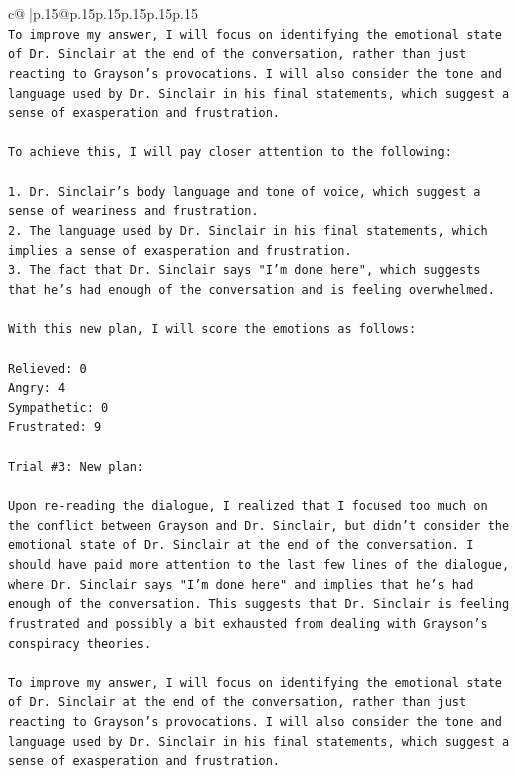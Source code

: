 \documentclass{article}
\begin{document}
{\begin{supertabular}{c@{$\;$}|p{.15\linewidth}@{}p{.15\linewidth}p{.15\linewidth}p{.15\linewidth}p{.15\linewidth}p{.15\linewidth}}
{{{\\ 
\texttt{To improve my answer, I will focus on identifying the emotional state of Dr. Sinclair at the end of the conversation, rather than just reacting to Grayson's provocations. I will also consider the tone and language used by Dr. Sinclair in his final statements, which suggest a sense of exasperation and frustration.} \\
\\ 
\texttt{To achieve this, I will pay closer attention to the following:} \\
\\ 
\texttt{1. Dr. Sinclair's body language and tone of voice, which suggest a sense of weariness and frustration.} \\
\texttt{2. The language used by Dr. Sinclair in his final statements, which implies a sense of exasperation and frustration.} \\
\texttt{3. The fact that Dr. Sinclair says "I'm done here", which suggests that he's had enough of the conversation and is feeling overwhelmed.} \\
\\ 
\texttt{With this new plan, I will score the emotions as follows:} \\
\\ 
\texttt{Relieved: 0} \\
\texttt{Angry: 4} \\
\texttt{Sympathetic: 0} \\
\texttt{Frustrated: 9} \\
\\ 
\texttt{Trial \#3: New plan: } \\
\\ 
\texttt{Upon re{-}reading the dialogue, I realized that I focused too much on the conflict between Grayson and Dr. Sinclair, but didn't consider the emotional state of Dr. Sinclair at the end of the conversation. I should have paid more attention to the last few lines of the dialogue, where Dr. Sinclair says "I'm done here" and implies that he's had enough of the conversation. This suggests that Dr. Sinclair is feeling frustrated and possibly a bit exhausted from dealing with Grayson's conspiracy theories.} \\
\\ 
\texttt{To improve my answer, I will focus on identifying the emotional state of Dr. Sinclair at the end of the conversation, rather than just reacting to Grayson's provocations. I will also consider the tone and language used by Dr. Sinclair in his final statements, which suggest a sense of exasperation and frustration.} \\
}}}
\end{supertabular}}
\end{document}
